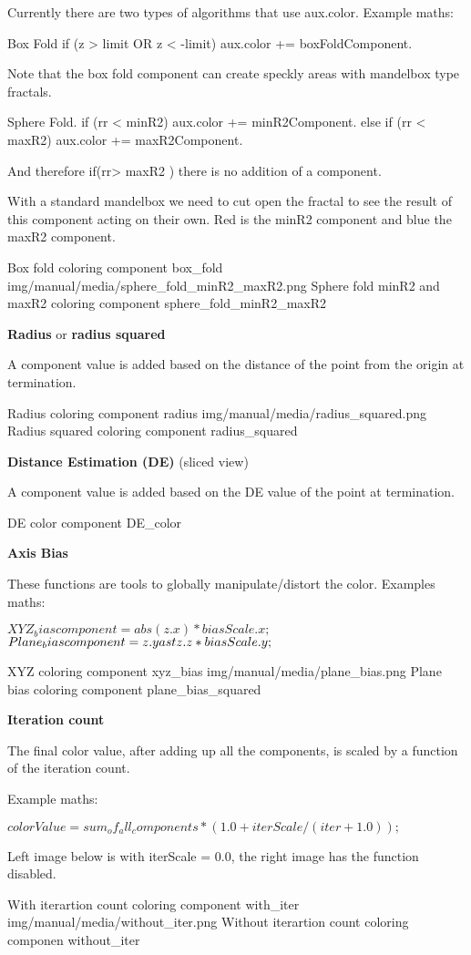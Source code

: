 Currently there are two types of algorithms that use aux.color.  Example maths:

Box Fold
if  (z  >  limit  OR  z  <   -limit)   aux.color +=  boxFoldComponent.

Note that the box fold component can create  speckly areas with mandelbox type fractals.

Sphere Fold. 
if (rr < minR2)    aux.color +=  minR2Component.
else if (rr < maxR2)    aux.color +=  maxR2Component.

And therefore  if(rr> maxR2 ) there is no addition of a component.

With a standard mandelbox we need to cut open the fractal to see the result of this component acting on their own. Red is the minR2 component and blue the maxR2 component.


{Box fold coloring component}
{box_fold}
{img/manual/media/sphere_fold_minR2_maxR2.png}
{Sphere fold minR2 and maxR2 coloring component}
{sphere_fold_minR2_maxR2}


\textbf{Radius} or \textbf{radius squared} 

A  component value is added based on the distance of the point from the origin at termination.


{Radius coloring component}
{radius}
{img/manual/media/radius_squared.png}
{Radius squared coloring component}
{radius_squared}

\textbf{Distance Estimation (DE)}  (sliced view)

A  component value is added based on the DE value of the point at termination.

{DE color component}
{DE_color}

\textbf{Axis Bias}

These functions are tools to globally manipulate/distort the color. 
Examples maths:

$XYZ_bias                component = abs(z.x) \ast biasScale.x;$
$Plane_bias              component = z.y \\ast z.z \ast biasScale.y;$

{XYZ coloring component}
{xyz_bias}
{img/manual/media/plane_bias.png}
{Plane bias coloring component}
{plane_bias_squared}

\textbf{Iteration count}

The final color value, after adding up all the components, is  scaled by a function of the iteration count.

Example maths:

$colorValue =  sum_of_all_components *  ( 1.0 + iterScale / ( iter + 1.0));$

Left image below is with iterScale = 0.0, the right image has the function disabled.

{With iterartion count coloring component}
{with_iter}
{img/manual/media/without_iter.png}
{Without iterartion count coloring componen}
{without_iter}



